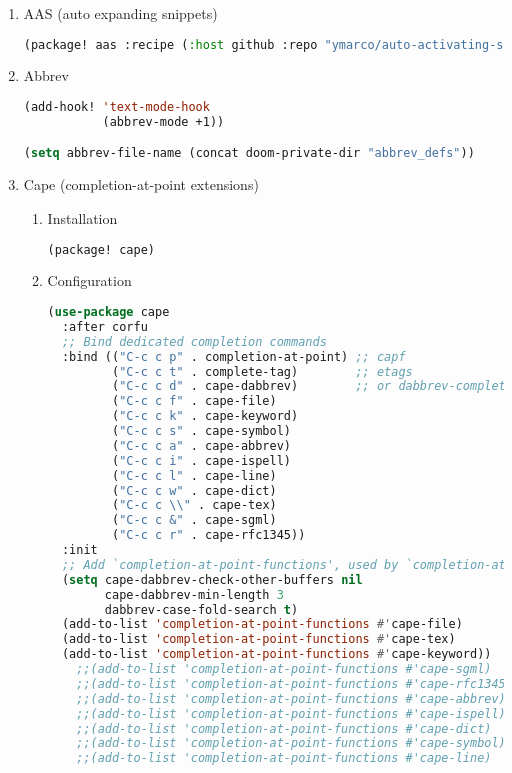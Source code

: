 \documentclass[11pt]{article}
\begin{document}
\begin{enumerate}
  \item AAS (auto expanding snippets)
  \label{sec:aas-auto-expanding-snippets}

  \begin{lstlisting}[language=Lisp]
(package! aas :recipe (:host github :repo "ymarco/auto-activating-snippets"))
\end{lstlisting}
  \item Abbrev
  \label{sec:abbrev}

  \begin{lstlisting}[language=Lisp]
(add-hook! 'text-mode-hook
           (abbrev-mode +1))

(setq abbrev-file-name (concat doom-private-dir "abbrev_defs"))
\end{lstlisting}
  \item Cape (completion-at-point extensions)
  \label{sec:cape-completion-at-point-extensions}

  
\begin{enumerate}
  \item Installation
  \label{sec:installation}

  \begin{lstlisting}[language=Lisp]
(package! cape)
\end{lstlisting}
  \item Configuration
  \label{sec:configuration}

  \begin{lstlisting}[language=Lisp]
(use-package cape
  :after corfu
  ;; Bind dedicated completion commands
  :bind (("C-c c p" . completion-at-point) ;; capf
         ("C-c c t" . complete-tag)        ;; etags
         ("C-c c d" . cape-dabbrev)        ;; or dabbrev-completion
         ("C-c c f" . cape-file)
         ("C-c c k" . cape-keyword)
         ("C-c c s" . cape-symbol)
         ("C-c c a" . cape-abbrev)
         ("C-c c i" . cape-ispell)
         ("C-c c l" . cape-line)
         ("C-c c w" . cape-dict)
         ("C-c c \\" . cape-tex)
         ("C-c c &" . cape-sgml)
         ("C-c c r" . cape-rfc1345))
  :init
  ;; Add `completion-at-point-functions', used by `completion-at-point'.
  (setq cape-dabbrev-check-other-buffers nil
        cape-dabbrev-min-length 3
        dabbrev-case-fold-search t)
  (add-to-list 'completion-at-point-functions #'cape-file)
  (add-to-list 'completion-at-point-functions #'cape-tex)
  (add-to-list 'completion-at-point-functions #'cape-keyword))
    ;;(add-to-list 'completion-at-point-functions #'cape-sgml)
    ;;(add-to-list 'completion-at-point-functions #'cape-rfc1345)
    ;;(add-to-list 'completion-at-point-functions #'cape-abbrev)
    ;;(add-to-list 'completion-at-point-functions #'cape-ispell)
    ;;(add-to-list 'completion-at-point-functions #'cape-dict)
    ;;(add-to-list 'completion-at-point-functions #'cape-symbol)
    ;;(add-to-list 'completion-at-point-functions #'cape-line)
\end{lstlisting}
\end{enumerate}


\end{enumerate}
\end{document}
